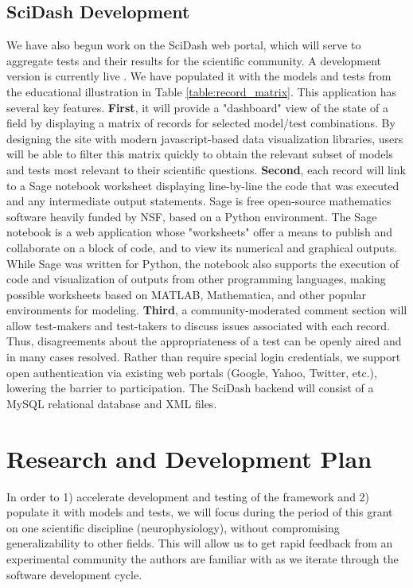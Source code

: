 \documentclass[11pt,letterpaper]{article}
\begin{document}
\subsection{SciDash Development}
We have also begun work on the SciDash web portal, which will serve to aggregate tests and their results for the scientific community. A development version is currently live \cite{scidash_url}.  We have populated it with the models and tests from the educational illustration in Table \ref{table:record_matrix}.  This application has several key features.  \textbf{First}, it will provide a "dashboard" view of the state of a field by displaying a matrix of records for selected model/test combinations.  By designing the site with modern javascript-based data visualization libraries, users will be able to filter this matrix quickly to obtain the relevant subset of models and tests most relevant to their scientific questions.  \textbf{Second}, each record will link to a Sage notebook worksheet displaying line-by-line the code that was executed and any intermediate output statements.  Sage \cite{stein_sage:_2005,sage_url} is free open-source mathematics software heavily funded by NSF, based on a Python environment.  The Sage notebook \cite{sagenb_url} is a web application whose "worksheets" offer a means to publish and collaborate on a block of code, and to view its numerical and graphical outputs.  While Sage was written for Python, the notebook also supports the execution of code and visualization of outputs from other programming languages, making possible worksheets based on MATLAB, Mathematica, and other popular environments for modeling.  \textbf{Third}, a community-moderated comment section will allow test-makers and test-takers to discuss issues associated with each record.  Thus, disagreements about the appropriateness of a test can be openly aired and in many cases resolved.  Rather than require special login credentials, we support open authentication via existing web portals (Google, Yahoo, Twitter, etc.), lowering the barrier to participation.  The SciDash backend will consist of a MySQL relational database and XML files.  

\section{Research and Development Plan}
In order to 1) accelerate development and testing of the framework and 2) populate it with models and tests, we will focus during the period of this grant on one scientific discipline (neurophysiology), without compromising generalizability to other fields. This will allow us to get rapid feedback from an experimental community the authors are familiar with as we iterate through the software development cycle.  
\end{document}
